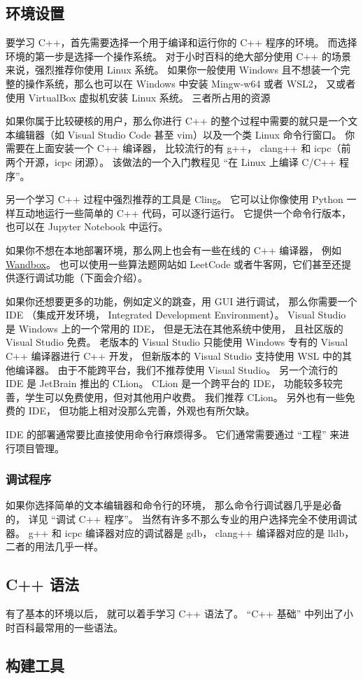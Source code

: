 

\begin{issues}
\issueDraft
\end{issues}

\subsection{环境设置}
要学习 C++，首先需要选择一个用于编译和运行你的 C++ 程序的环境。 而选择环境的第一步是选择一个操作系统。 对于小时百科的绝大部分使用 C++ 的场景来说，强烈推荐你使用 Linux 系统。 如果你一般使用 Windows 且不想装一个完整的操作系统，那么也可以在 Windows 中安装 Mingw-w64 或者 WSL2， 又或者使用 VirtualBox 虚拟机安装 Linux 系统。 三者所占用的资源

如果你属于比较硬核的用户，那么你进行 C++ 的整个过程中需要的就只是一个文本编辑器（如 Visual Studio Code 甚至 vim）以及一个类 Linux 命令行窗口。 你需要在上面安装一个 C++ 编译器， 比较流行的有 g++， clang++ 和 icpc（前两个开源，icpc 闭源）。 该做法的一个入门教程见 “在 Linux 上编译 C/C++ 程序”。

另一个学习 C++ 过程中强烈推荐的工具是 Cling。 它可以让你像使用 Python 一样互动地运行一些简单的 C++ 代码，可以逐行运行。 它提供一个命令行版本，也可以在 Jupyter Notebook 中运行。

如果你不想在本地部署环境，那么网上也会有一些在线的 C++ 编译器， 例如 \href{https://wandbox.org/}{Wandbox}。 也可以使用一些算法题网站如 LeetCode 或者牛客网，它们甚至还提供逐行调试功能（下面会介绍）。

如果你还想要更多的功能，例如定义的跳查，用 GUI 进行调试， 那么你需要一个 IDE （集成开发环境， Integrated Development Environment）。 Visual Studio 是 Windows 上的一个常用的 IDE， 但是无法在其他系统中使用， 且社区版的 Visual Studio 免费。 老版本的 Visual Studio 只能使用 Windows 专有的 Visual C++ 编译器进行 C++ 开发， 但新版本的 Visual Studio 支持使用 WSL 中的其他编译器。 由于不能跨平台，我们不推荐使用 Visual Studio。 另一个流行的 IDE 是 JetBrain 推出的 CLion。 CLion 是一个跨平台的 IDE， 功能较多较完善，学生可以免费使用，但对其他用户收费。 我们推荐 CLion。 另外也有一些免费的 IDE， 但功能上相对没那么完善，外观也有所欠缺。

IDE 的部署通常要比直接使用命令行麻烦得多。 它们通常需要通过 “工程” 来进行项目管理。

\subsubsection{调试程序}
如果你选择简单的文本编辑器和命令行的环境， 那么命令行调试器几乎是必备的， 详见 “调试 C++ 程序”。 当然有许多不那么专业的用户选择完全不使用调试器。 g++ 和 icpc 编译器对应的调试器是 gdb， clang++ 编译器对应的是 lldb， 二者的用法几乎一样。

\subsection{C++ 语法}
有了基本的环境以后， 就可以着手学习 C++ 语法了。 “C++ 基础” 中列出了小时百科最常用的一些语法。

\subsection{构建工具}
